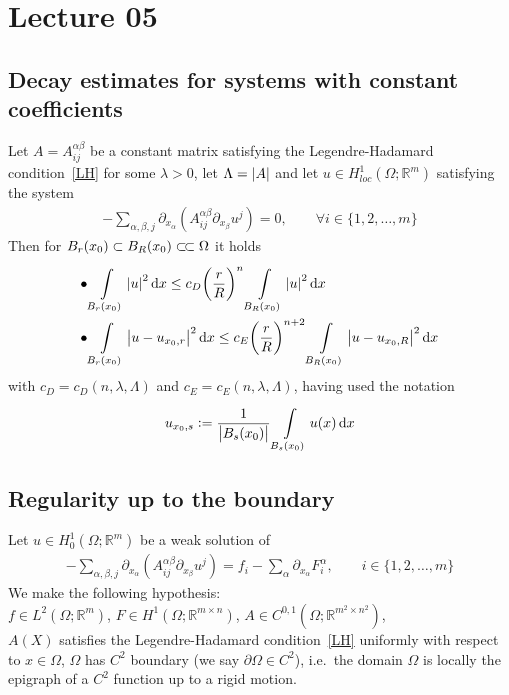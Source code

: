 \chapter{Lecture 05}

\section{Decay estimates for systems with constant coefficients}

\begin{lem}[]
	Let \( A=A_{ij}^{\alpha \beta } \) be a constant matrix satisfying the Legendre-Hadamard condition~\eqref{LH} for some \( \lambda > 0 \), let \( \Lambda = \abs{A} \) and let \( u \in  H_{loc}^{1}(\Omega ; \mathbb{R}^{m})  \) satisfying the system
	\begin{gather}
		- \sum\limits_{\alpha, \beta, j}^{} \partial_{x_{\alpha }} \left( A_{ij}^{\alpha \beta } \partial_{x_{\beta}}  u^{j} \right) = 0, \qquad \forall  i \in \{ 1,2,\ldots , m \}
	\end{gather}
	Then for \( B_{r}(x_{0}) \subset  B_{R}(x_{0}) \ssubset \Omega  \) it holds
	\begin{align}
		\bullet & \int\limits_{B_{r}(x_{0})}^{} \abs{u}^{2} \dd{x} \leq c_{D} {\left( \frac{r}{R} \right)}^{n} \int\limits_{B_{R}(x_{0})}^{} \abs{u}^{2} \dd{x}  \\
		\bullet & \int\limits_{B_{r}(x_{0})}^{} \abs{u-u_{x_{0},r}}^{2} \dd{x} \leq c_{E} {\left( \frac{r}{R} \right)}^{n+2} \int\limits_{B_{R}(x_{0})}^{} \abs{u-u_{x_{0},R}}^{2} \dd{x}
	\end{align}
	with \( c_{D}=c_{D}(n,\lambda, \Lambda  ) \) and \( c_{E}=c_{E}(n, \lambda , \Lambda ) \), having used the notation
	\begin{gather}
		u_{x_{0},s}:= \frac{1}{\abs{B_{s}(x_{0})}} \int\limits_{B_{s}(x_{0})}^{} u(x)  \dd{x}
	\end{gather}
\end{lem}

\section{Regularity up to the boundary}

Let \( u \in H_{0}^{1}(\Omega ; \mathbb{R}^{m})  \) be a weak solution of
\begin{gather}
	- \sum\limits_{\alpha, \beta, j}^{} \partial_{x_{\alpha }} \left( A_{ij}^{\alpha \beta } \partial_{x_{\beta}}  u^{j} \right) = f_{i} - \sum\limits_{\alpha }^{} \partial_{x_{\alpha }} F_{i}^{\alpha }, \qquad i \in \{ 1,2,\ldots,m \}
\end{gather}
We make the following hypothesis: \\
\( f \in L^{2}(\Omega ; \mathbb{R}^{m}) \), \( F \in H^{1}(\Omega ; \mathbb{R}^{m \times n})  \), \( A \in C^{0,1}(\Omega ; \mathbb{R}^{m^{2}\times n^{2}})  \), \\
\( A(X)  \) satisfies the Legendre-Hadamard condition~\eqref{LH} uniformly with respect to \( x \in \Omega  \), \( \Omega  \) has \( C^{2} \) boundary (we say \( \partial \Omega \in  C^{2} \)), i.e.\ the domain \( \Omega  \) is locally the epigraph of a \( C^{2} \) function up to a rigid motion.

